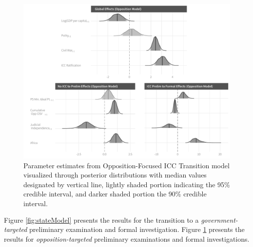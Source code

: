 \begin{figure}
    \centering
    \includegraphics[width=1\textwidth]{rebelCoefSumm.pdf}
    \caption{Parameter estimates from Opposition-Focused ICC Transition model visualized through posterior distributions with median values designated by vertical line, lightly shaded portion indicating the 95\% credible interval, and darker shaded portion the 90\% credible interval.}
    \label{fig:rebelModel}
\end{figure}

Figure \ref{fig:stateModel} presents the results for the transition to a \textit{government-targeted} preliminary examination and formal investigation. Figure \ref{fig:rebelModel} presents the results for \textit{opposition-targeted} preliminary examinations and formal investigations.

